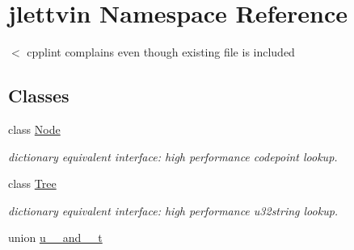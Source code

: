 \hypertarget{namespacejlettvin}{}\section{jlettvin Namespace Reference}
\label{namespacejlettvin}


$<$ cpplint complains even though existing file is included  


\subsection*{Classes}
\begin{DoxyCompactItemize}
\item 
class \hyperlink{classjlettvin_1_1_node}{Node}
\begin{DoxyCompactList}\small\item\em dictionary equivalent interface\+: high performance codepoint lookup. \end{DoxyCompactList}\item 
class \hyperlink{classjlettvin_1_1_tree}{Tree}
\begin{DoxyCompactList}\small\item\em dictionary equivalent interface\+: high performance u32string lookup. \end{DoxyCompactList}\item 
union \hyperlink{unionjlettvin_1_1u__32__and__8__t}{u\+\_\+\_\+and\+\_\+\_\+t}
\end{DoxyCompactItemize}
